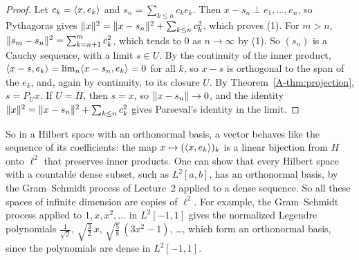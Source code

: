 \begin{proof}
    Let $c_k = \langle x, e_k \rangle$ and $s_n = \sum_{k \leq n} c_ke_k$. Then $x - s_n \perp e_1, \ldots, e_n$, so Pythagoras gives $\lVert x \rVert^2 = \lVert x - s_n \rVert^2 + \sum_{k \leq n} c_k^2$, which proves (1). For $m > n$, $\lVert s_m - s_n \rVert^2 = \sum_{k=n+1}^m c_k^2$, which tends to $0$ as $n \to \infty$ by (1). So $(s_n)$ is a Cauchy sequence, with a limit $s \in U$. By the continuity of the inner product, $\langle x - s, e_k \rangle = \lim_n \langle x - s_n, e_k \rangle = 0$ for all $k$, so $x - s$ is orthogonal to the span of the $e_k$, and, again by continuity, to its closure $U$. By Theorem~\ref{A-thm:projection}, $s = P_Ux$. If $U = H$, then $s = x$, so $\lVert x - s_n \rVert \to 0$, and the identity $\lVert x \rVert^2 = \lVert x - s_n \rVert^2 + \sum_{k \leq n} c_k^2$ gives Parseval's identity in the limit.
\end{proof}

So in a Hilbert space with an orthonormal basis, a vector behaves like the sequence of its coefficients: the map $x \mapsto (\langle x, e_k \rangle)_k$ is a linear bijection from $H$ onto $\ell^2$ that preserves inner products. One can show that every Hilbert space with a countable dense subset, such as $L^2[a, b]$, has an orthonormal basis, by the Gram--Schmidt process of Lecture~2 applied to a dense sequence. So all these spaces of infinite dimension are copies of $\ell^2$. For example, the Gram--Schmidt process applied to $1, x, x^2, \ldots$ in $L^2[-1, 1]$ gives the normalized Legendre polynomials $\frac{1}{\sqrt{2}}$, $\sqrt{\frac{3}{2}}\,x$, $\sqrt{\frac{5}{8}}\,(3x^2 - 1)$, \ldots, which form an orthonormal basis, since the polynomials are dense in $L^2[-1, 1]$.

